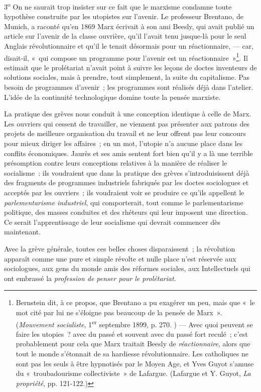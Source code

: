\documentclass[french,twoside]{book} %
\begin{document}
3\textsuperscript{o} On ne saurait trop insister sur ce fait que le marxisme condamne toute hypothèse construite par les utopistes sur l’avenir. Le professeur Brentano, de Munich, a raconté qu’en 1869 Marx écrivait à son ami Beesly, qui avait publié un article sur l’avenir de la classe ouvrière, qu’il l’avait tenu jusque-là pour le seul Anglais révolutionnaire et qu’il le tenait désormais pour un réactionnaire, — car, disait-il, « qui compose un programme pour l’avenir est un réactionnaire »\footnote{ \noindent Bernstein dit, à ce propos, que Brentano a pu exagérer un peu, mais que « le mot cité par lui ne s’éloigne pas beaucoup de la pensée de Marx ». (\emph{Mouvement socialiste}, 1\textsuperscript{er} septembre 1899, p. 270. ) — Avec quoi peuvent se faire les utopies ? avec du passé et souvent avec du passé fort reculé ; c’est probablement pour cela que Marx traitait Beesly de \emph{réactionnaire}, alors que tout le monde s’étonnait de sa hardiesse révolutionnaire. Les catholiques ne sont pas les seuls à être hypnotisés par le Moyen Age, et Yves Guyot s’amuse du « troubadourisme collectiviste » de Lafargue. (Lafargue et Y. Guyot, \emph{La propriété}, pp. 121-122.)
 }. Il estimait que le prolétariat n’avait point à suivre les leçons de doctes inventeurs de solutions sociales, mais à prendre, tout simplement, la suite du capitalisme. Pas besoin de programmes d’avenir ; les programmes sont réalisés déjà dans l’atelier. L’idée de la continuité technologique domine toute la pensée marxiste.\par
La pratique des grèves nous conduit à une conception  identique à celle de Marx. Les ouvriers qui cessent de travailler, ne viennent pas présenter aux patrons des projets de meilleure organisation du travail et ne leur offrent pas leur concours pour mieux diriger les affaires ; en un mot, l’utopie n’a aucune place dans les conflits économiques. Jaurès et ses amis sentent fort bien qu’il y a là une terrible présomption contre leurs conceptions relatives à la manière de réaliser le socialisme : ils voudraient que dans la pratique des grèves s’introduisissent déjà des fragments de programmes industriels fabriqués par les doctes sociologues et acceptés par les ouvriers ; ils voudraient voir se produire ce qu’ils appellent le \emph{parlementarisme industriel}, qui comporterait, tout comme le parlementarisme politique, des masses conduites et des rhéteurs qui leur imposent une direction. Ce serait l’apprentissage de leur socialisme qui devrait commencer dès maintenant.\par
Avec la grève générale, toutes ces belles choses disparaissent ; la révolution apparaît comme une pure et simple révolte et nulle place n’est réservée aux sociologues, aux gens du monde amis des réformes sociales, aux Intellectuels qui ont embrassé la \emph{profession de penser pour le prolétariat.}\par
\end{document}
